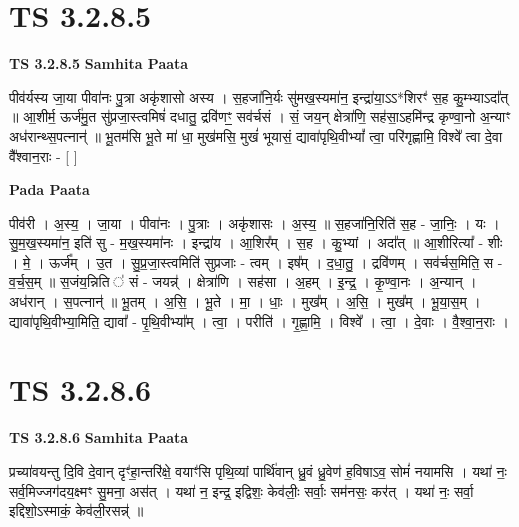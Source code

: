 \documentclass[17pt]{extarticle}
\begin{document}

\section{ TS 3.2.8.5 }

\textbf{TS 3.2.8.5 } \newline
\textbf{Samhita Paata} \newline

पीव॑र्यस्य जा॒या पीवा॑नः पु॒त्रा अकृ॑शासो अस्य । स॒हजा॑नि॒र्यः सु॑मख॒स्यमा॑न॒ इन्द्रा॑या॒ऽऽ*शिरꣳ॑ स॒ह कु॒म्भ्याऽदा᳚त् ॥ आ॒शीर्म॒ ऊर्ज॑मु॒त सु॑प्रजा॒स्त्वमिषं॑ दधातु॒ द्रवि॑णꣳ॒॒ सव॑र्चसं । सं॒ जय॒न् क्षेत्रा॑णि॒ सह॑सा॒ऽहमि॑न्द्र कृण्वा॒नो अ॒न्याꣳ अध॑रान्थ्स॒पत्नान्॑ ॥ भू॒तम॑सि भू॒ते मा॑ धा॒ मुख॑मसि॒ मुखं॑ भूयासं॒ द्यावा॑पृथि॒वीभ्यां᳚ त्वा॒ परि॑गृह्णामि॒ विश्वे᳚ त्वा दे॒वा वै᳚श्वान॒राः - [  ] \newline

\textbf{Pada Paata} \newline

पीव॑री । अ॒स्य॒ । जा॒या । पीवा॑नः । पु॒त्राः । अकृ॑शासः । अ॒स्य॒ ॥ स॒हजा॑नि॒रिति॑ स॒ह - जा॒निः॒ । यः । सु॒म॒ख॒स्यमा॑न॒ इति॑ सु - म॒ख॒स्यमा॑नः । इन्द्रा॑य । आ॒शिर᳚म् । स॒ह । कु॒भ्यां । अदा᳚त् ॥ आ॒शीरित्या᳚ - शीः । मे॒ । ऊर्ज᳚म् । उ॒त । सु॒प्र॒जा॒स्त्वमिति॑ सुप्रजाः - त्वम् । इष᳚म् । द॒धा॒तु॒ । द्रवि॑णम् । सव॑र्चस॒मिति॒ स - व॒र्च॒स॒म् ॥ स॒जंय॒न्निति ॑ सं - जयन्न्॑ । क्षेत्रा॑णि । सह॑सा । अ॒हम् । इ॒न्द्र॒ । कृ॒ण्वा॒नः । अ॒न्यान् । अध॑रान् । स॒पत्नान्॑ ॥ भू॒तम् । अ॒सि॒ । भू॒ते । मा॒ । धाः॒ । मुख᳚म् । अ॒सि॒ । मुख᳚म् । भू॒या॒स॒म् । द्यावा॑पृथि॒वीभ्या॒मिति॒ द्यावा᳚ - पृ॒थि॒वीभ्या᳚म् । त्वा॒ । परीति॑ । गृ॒ह्णा॒मि॒ । विश्वे᳚ । त्वा॒ । दे॒वाः । वै॒श्वा॒न॒राः ।  \newline





\section{ TS 3.2.8.6 }

\textbf{TS 3.2.8.6 } \newline
\textbf{Samhita Paata} \newline

प्रच्या॑वयन्तु दि॒वि दे॒वान् दृꣳ॑हा॒न्तरि॑क्षे॒ वयाꣳ॑सि पृथि॒व्यां पार्थि॑वान् ध्रु॒वं ध्रु॒वेण॑ ह॒विषाऽव॒ सोमं॑ नयामसि । यथा॑ नः॒ सर्व॒मिज्जग॑दय॒क्ष्मꣳ सु॒मना॒ अस॑त् । यथा॑ न॒ इन्द्र॒ इद्विशः॒ केव॑लीः॒ सर्वाः॒ सम॑नसः॒ कर॑त् । यथा॑ नः॒ सर्वा॒ इद्दिशो॒ऽस्माकं॒ केव॑ली॒रसन्न्॑ ॥ \newline
\end{document}
